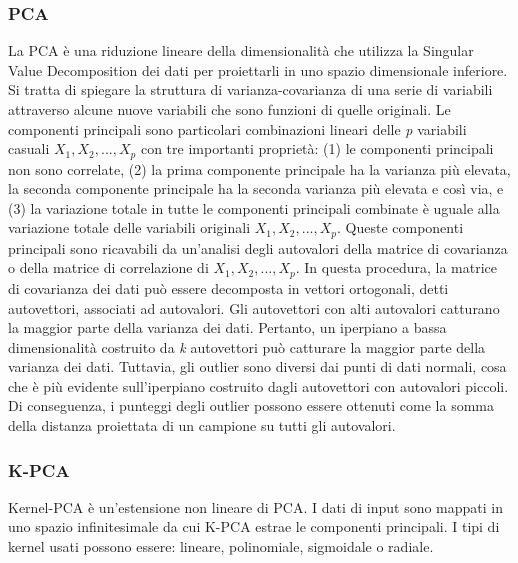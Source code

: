 \subsubsection{PCA}
La PCA \cite{shyu2003novel} è una riduzione lineare della dimensionalità che utilizza la Singular Value Decomposition dei dati per proiettarli in uno spazio dimensionale inferiore. Si tratta di spiegare la struttura di varianza-covarianza di una serie di variabili attraverso alcune nuove variabili che sono funzioni di quelle originali. Le componenti principali sono particolari combinazioni lineari delle \textit{p} variabili casuali  \(X_1, X_2, ..., X_p\) con tre importanti proprietà: (1) le componenti principali non sono correlate, (2) la prima componente principale ha la varianza più elevata, la seconda componente principale ha la seconda varianza più elevata e così via, e (3) la variazione totale in tutte le componenti principali combinate è uguale alla variazione totale delle variabili originali \(X_1, X_2, ..., X_p\). 
Queste componenti principali sono ricavabili da un'analisi degli autovalori della matrice di covarianza o della matrice di correlazione di \(X_1, X_2, ..., X_p\).
In questa procedura, la matrice di covarianza dei dati può essere decomposta in vettori ortogonali, detti autovettori, associati ad autovalori. Gli autovettori con alti autovalori catturano la maggior parte della varianza dei dati. Pertanto, un iperpiano a bassa dimensionalità costruito da \textit{k} autovettori può catturare la maggior parte della varianza dei dati. Tuttavia, gli outlier sono diversi dai punti di dati normali, cosa che è più evidente sull'iperpiano costruito dagli autovettori con autovalori piccoli.
Di conseguenza, i punteggi degli outlier possono essere ottenuti come la somma della distanza proiettata di un campione su tutti gli autovalori.

\subsubsection{K-PCA}
Kernel-PCA \cite{hoffmann2007kernel} è un'estensione non lineare di PCA. I dati di input sono mappati in uno spazio infinitesimale da cui K-PCA estrae le componenti principali. I tipi di kernel usati possono essere: lineare, polinomiale, sigmoidale o radiale.



